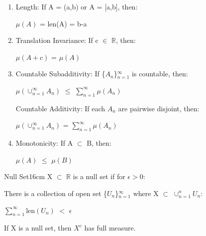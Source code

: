     \begin{enumerate}[label=(\alph*), leftmargin=2cm, itemsep=0.1cm]
        \item {\color{lgreen} Length}:
            If A = (a,b) or A = [a,b], then:

            \hspace{0.5cm}
            $\mu(A)$ = len(A) = b-a

        \item {\color{lgreen} Translation Invariance}:
            If c $\in$ $\mathbb{R}$, then:
            
            \hspace{0.5cm}
            $\mu(A+c)$ = $\mu(A)$

        \item {\color{lgreen} Countable Subadditivity}:
            If \{$A_n$\}$_{n=1}^{\infty}$ is countable, then:

            \hspace{0.5cm}
            $\mu(\cup_{n=1}^{\infty} A_n)$
            $\leq$ $\sum_{n=1}^{\infty} \mu(A_n)$

            {\color{lgreen} Countable Additivity}:
            If each $A_n$ are pairwise disjoint, then:

            \hspace{0.5cm}
            $\mu(\cup_{n=1}^{\infty} A_n)$
            = $\sum_{n=1}^{\infty} \mu(A_n)$

        \item {\color{lgreen} Monotonicity}:
            If A $\subset$ B, then:

            \hspace{0.5cm}
            $\mu(A)$ $\leq$ $\mu(B)$
    \end{enumerate}

    \newpage



    \begin{definition}{Null Set}{16cm}
        X $\subset$ $\mathbb{R}$ is a {\color{lblue} null set}
        if for $\epsilon > 0$:

        \hspace{0.5cm}
        There is a collection of open set \{$U_n$\}$_{n=1}^{\infty}$
        where X $\subset$ $\cup_{n=1}^n U_n$:

        \hspace{1cm}
        $\sum_{n=1}^{\infty} \text{len}(U_n)$ $<$ $\epsilon$

        If X is a null set, then $X^c$ has full measure.
    \end{definition}

